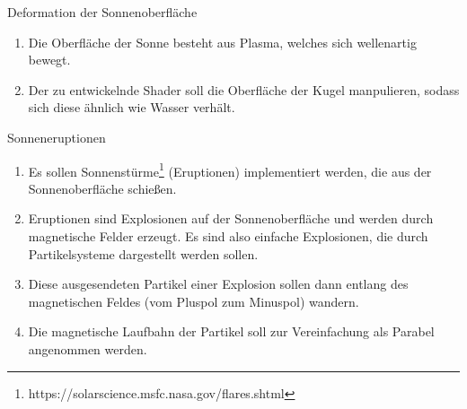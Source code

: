 \documentclass{article}
\begin{document}
\begin{enumerate}
    {\bfseries\large\item Deformation der Sonnenoberfläche}
    \begin{enumerate}
      \item Die Oberfläche der Sonne besteht aus Plasma, welches sich
        wellenartig bewegt.
      \item Der zu entwickelnde Shader soll die Oberfläche der Kugel
        manpulieren, sodass sich diese ähnlich wie Wasser verhält.
    \end{enumerate}

    \vspace{0.5cm}

    {\bfseries\large\item Sonneneruptionen}
    \begin{enumerate}
      \item Es sollen
        Sonnenstürme\footnote{https://solarscience.msfc.nasa.gov/flares.shtml}
        (Eruptionen) implementiert werden, die aus der Sonnenoberfläche
        schießen.
      \item Eruptionen sind Explosionen auf der Sonnenoberfläche und werden
        durch magnetische Felder erzeugt. Es sind also einfache Explosionen, die
        durch Partikelsysteme dargestellt werden sollen.
      \item Diese ausgesendeten Partikel einer Explosion sollen dann entlang des
        magnetischen Feldes (vom Pluspol zum Minuspol) wandern.
      \item Die magnetische Laufbahn der Partikel soll zur Vereinfachung als
        Parabel angenommen werden.
    \end{enumerate}

  \end{enumerate}
\end{document}
